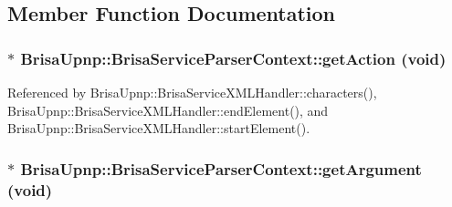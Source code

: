 \subsection{Member Function Documentation}
\hypertarget{classBrisaUpnp_1_1BrisaServiceParserContext_a47ace4eeb3df57509896fb9723363edf}{
\subsubsection[{getAction}]{$\ast$ BrisaUpnp::BrisaServiceParserContext::getAction (void)}}
\label{classBrisaUpnp_1_1BrisaServiceParserContext_a47ace4eeb3df57509896fb9723363edf}


Referenced by BrisaUpnp::BrisaServiceXMLHandler::characters(), BrisaUpnp::BrisaServiceXMLHandler::endElement(), and BrisaUpnp::BrisaServiceXMLHandler::startElement().\hypertarget{classBrisaUpnp_1_1BrisaServiceParserContext_a7f2c5fe31b0689cf6c23a010e6be3fb4}{
\subsubsection[{getArgument}]{$\ast$ BrisaUpnp::BrisaServiceParserContext::getArgument (void)}}
\label{classBrisaUpnp_1_1BrisaServiceParserContext_a7f2c5fe31b0689cf6c23a010e6be3fb4}


